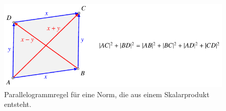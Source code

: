 %
%
%
\begin{figure}
\centering
\includegraphics{chapters/010-skalarprodukt/images/parallelogramm.pdf}
\caption{Parallelogrammregel für eine Norm, die aus einem Skalarprodukt
entsteht.
\label{skalarprodukt:cauchyschwarz:fig:parallelogramm}}
\end{figure}
